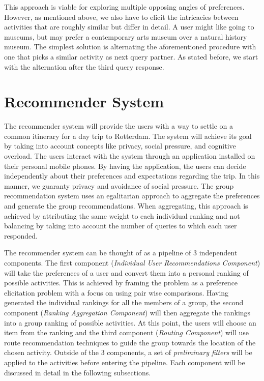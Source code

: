 \documentclass[11pt,a4paper,oneside]{article}
\begin{document}
This approach is viable for exploring multiple opposing angles of preferences. However, as mentioned above, we also have to elicit the intricacies between activities that are roughly similar but differ in detail. A user might like going to museums, but may prefer a contemporary arts museum over a natural history museum. The simplest solution is alternating the aforementioned procedure with one that picks a similar activity as next query partner. As stated before, we start with the alternation after the third query response. 



\section{Recommender System}
\label{sec:rs}
The recommender system will provide the users with a way to settle on a common itinerary for a day trip to Rotterdam. The system will achieve its goal by taking into account concepts like privacy, social pressure, and cognitive overload. The users interact with the system through an application installed on their personal mobile phones. By having the application, the users can decide independently about their preferences and expectations regarding the trip. In this manner, we guaranty privacy and avoidance of social pressure. The group recommendation system uses an egalitarian approach to aggregate the preferences and generate the group recommendations. When aggregating, this approach is achieved by attributing the same weight to each individual ranking and not balancing by taking into account the number of queries to which each user responded.

The recommender system can be thought of as a pipeline of 3 independent components. The first component (\emph{Individual User Recommendations Component}) will take the preferences of a user and convert them into a personal ranking of possible activities. This is achieved by framing the problem as a preference elicitation problem with a focus on using pair wise comparisons. Having generated the individual rankings for all the members of a group, the second component (\emph{Ranking Aggregation Component}) will then aggregate the rankings into a group ranking of possible activities. At this point, the users will choose an item from the ranking and the third component (\emph{Routing Component}) will use route recommendation techniques to guide the group towards the location of the chosen activity. Outside of the 3 components, a set of \emph{preliminary filters} will be applied to the activities before entering the pipeline. Each component will be discussed in detail in the following subsections.
\end{document}
